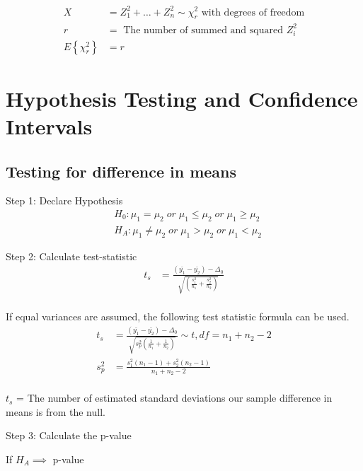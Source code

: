 \documentclass[10pt]{article}
\newcommand{\define}[1]{\colorbox{Thistle2}{#1}}
\newcommand{\mean}[1]{\mu_{#1}}
\renewcommand{\exp}[1]{E\left\{#1\right\}} %
\newcommand{\svar}[1]{s^2_{#1}} %
\begin{document}
\begin{multicols}{3}
    \begin{align*}
        X              & = Z_1^2 + \dots + Z_n^2 \sim \chi_r^2 \text{ with degrees of freedom} \\
        r              & = \text{ The number of summed and squared } Z_i^2                     \\
        \exp{\chi_r^2} & = r
    \end{align*}

    \section{Hypothesis Testing and Confidence Intervals}

    \subsection{Testing for difference in means}

    Step 1: Declare Hypothesis
    \begin{align*}
         & H_0: \mean{1} = \mean{2} \;or\; \mean{1} \leq \mean{2} \;or\; \mean{1} \geq \mean{2} \\
         & H_A: \mean{1} \neq \mean{2} \;or\; \mean{1} > \mean{2} \;or\; \mean{1} < \mean{2}
    \end{align*}

    Step 2: Calculate test-statistic
    \begin{align*}
        t_s & = \frac{(\bar{y_1} - \bar{y_2}) - \Delta_0}{\sqrt{\left(\frac{\svar{1}}{n_1} + \frac{\svar{2}}{n_2}\right)}} \\
    \end{align*}

    If equal variances are assumed, the following test statistic formula can be used.
    \begin{align*}
        t_s      & = \frac{(\bar{y_1} - \bar{y_2}) - \Delta_0}{\sqrt{\svar{p} (\frac{1}{n_1} + \frac{1}{n_2})}} \sim t, df = n_1 + n_2 - 2 \\
        \svar{p} & = \frac{\svar{1} (n_1-1) + \svar{2} (n_2-1)}{n_1 + n_2 - 2}                                                             \\
    \end{align*}

    \define{$t_s$} = The number of estimated standard deviations our sample difference in means is from the null.

    Step 3: Calculate the p-value

    If $H_A \implies$ p-value


\end{multicols}
\end{document}
